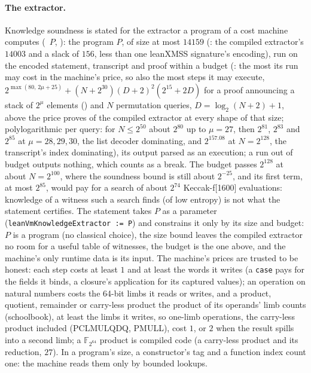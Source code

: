 \documentclass[11pt]{article}
\begin{document}
\paragraph{The extractor.} Knowledge soundness is stated for the extractor a program of a cost
machine computes (~$P$, ): the
program $P$, of size at most $14159$ (: the compiled
extractor's $14003$ and a slack of $156$, less than one leanXMSS signature's encoding), run on the encoded
statement, transcript and proof within a budget (: the most its
run may cost in the machine's price, so also the most steps it may execute,
$2^{\max(80,\,2\mu + 25)} + (N + 2^{30})(D + 2)^2(2^{15} + 2D)$ for a proof announcing a stack of $2^\mu$
elements () and $N$ permutation queries, $D = \log_2(N + 2) + 1$, above the
price  proves of the compiled extractor at every shape of that size; polylogarithmic
per query: for $N \le 2^{50}$ about $2^{80}$ up to $\mu = 27$, then $2^{81}$, $2^{83}$ and $2^{85}$ at $\mu = 28, 29, 30$, the list
decoder dominating, and $2^{157.08}$ at $N = 2^{128}$, the transcript's index dominating), its output
parsed as an execution; a run out of budget outputs nothing, which counts as a break. The budget
passes $2^{128}$ at about $N = 2^{100}$, where the soundness bound is still about $2^{-25}$, and its first
term, at most $2^{85}$, would pay for a search of about $2^{74}$ Keccak-f[1600] evaluations: knowledge
of a witness such a search finds
(of low entropy) is not what the statement certifies. The
statement takes $P$ as a parameter (\texttt{leanVmKnowledgeExtractor := P}) and constrains it only
by its size and budget: $P$ is a program (no classical choice), the size bound leaves the compiled
extractor no room for a useful table of witnesses, the budget is the one above, and the machine's
only runtime data is its input. The machine's prices are trusted to be honest: each step costs at
least $1$ and at least the words it writes (a \texttt{case} pays for the fields it binds, a
closure's application for its captured values); an operation on natural numbers costs the 64-bit
limbs it reads or writes, and a product, quotient, remainder or carry-less product the product of
its operands' limb counts (schoolbook), at least the limbs it writes, so one-limb operations, the
carry-less product included (PCLMULQDQ, PMULL), cost $1$, or $2$ when the result spills into a
second limb; a $\mathbb{F}_{2^{64}}$ product is compiled code (a carry-less product
and its reduction, $27$). In a program's size, a constructor's tag and a function index count one:
the machine reads them only by bounded lookups.
\end{document}
